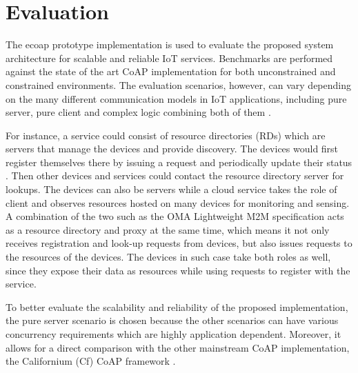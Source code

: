 \chapter{Evaluation}\label{ch5}

The ecoap prototype implementation is used to evaluate the proposed system architecture for scalable and reliable IoT services. Benchmarks are performed against the state of the art CoAP implementation for both unconstrained and constrained environments. The evaluation scenarios, however, can vary depending on the many different communication models in IoT applications, including pure server, pure client and complex logic combining both of them \autocite{kovatsch2015scalable}. 

For instance, a service could consist of resource directories (RDs) which are servers that manage the devices and provide discovery. The devices would first register themselves there by issuing a request and periodically update their status \autocite{core_directory}. Then other devices and services could contact the resource directory server for lookups. The devices can also be servers while a cloud service takes the role of client and observes resources hosted on many devices for monitoring and sensing. A combination of the two such as the OMA Lightweight M2M \autocite{lwm2m} specification acts as a resource directory and proxy at the same time, which means it not only receives registration and look-up requests from devices, but also issues requests to the resources of the devices. The devices in such case take both roles as well, since they expose their data as resources while using requests to register with the service.

To better evaluate the scalability and reliability of the proposed implementation, the pure server scenario is chosen because the other scenarios can have various concurrency requirements which are highly application dependent. Moreover, it allows for a direct comparison with the other mainstream CoAP implementation, the Californium (Cf) CoAP framework \autocite{californium}.

